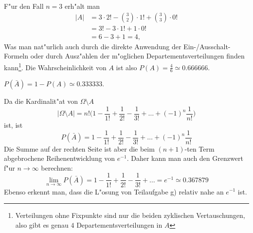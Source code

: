 \begin{loesung}
\begin{teilaufgaben}
F"ur den Fall $n=3$ erh"alt man
\begin{align*}
|A|
&=
3\cdot 2! - \binom{3}{2}\cdot 1! + \binom{3}{3}\cdot 0! 
\\
&=
3! - 3\cdot 1! + 1\cdot 0!
\\
&=
6-3+1=4,
\end{align*}
Was man nat"urlich auch durch die direkte Anwendung der Ein-/Ausschalt-Formeln
oder durch Ausz"ahlen der m"oglichen Departementsverteilungen finden kann\footnote{Verteilungen ohne Fixpunkte sind nur die beiden zyklischen Vertauschungen,
also gibt es genau $4$ Departementsverteilungen in $A$}.
Die Wahrscheinlichkeit von $A$ ist also $P(A)=\frac{4}{6}\simeq0.666666$.
\item
$P(\bar A)=1-P(A)\simeq 0.333333$.
\end{teilaufgaben}
Da die Kardinalit"at von $\Omega\setminus A$
\[
|\Omega\setminus A|
= n!\biggl(1-\frac1{1!}+\frac1{2!}-\frac1{3!}+\dots+(-1)^n\frac1{n!}\biggr)
\]
ist, ist
\[
P(\bar A)
= 1-\frac1{1!}+\frac1{2!}-\frac1{3!}+\dots+(-1)^n\frac1{n!}
\]
Die Summe auf der rechten Seite ist aber die beim $(n+1)$-ten Term
abgebrochene Reihenentwicklung von $e^{-1}$. Daher kann man auch
den Grenzwert f"ur $n\to\infty$ berechnen:
\[
\lim_{n\to\infty}P(\bar A)
= 1-\frac1{1!}+\frac1{2!}-\frac1{3!}+\dots=e^{-1}
\simeq 0.367879
\]
Ebenso erkennt man, dass die L"osung von Teilaufgabe g) relativ
nahe an $e^{-1}$ ist.
\end{loesung}

